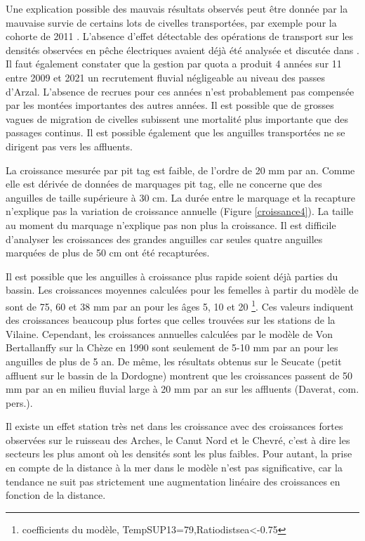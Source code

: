 \documentclass[10pt,twocolumn,titlepage,twoside]{article}\usepackage[]{graphicx}\usepackage[]{color}
\begin{document}
Une explication possible des mauvais résultats observés peut être donnée par la
mauvaise survie de certains lots de civelles transportées, par exemple pour la
cohorte de 2011 \citep{mazel_v._operation_2011}. L'absence d'effet détectable des opérations
de transport sur les densités
observées en pêche électriques avaient déjà été analysée et discutée dans
\citet{briand_analyse_2011}. Il faut également constater que la gestion par
quota a produit 4 années sur 11 entre 2009 et 2021 un
recrutement fluvial négligeable au niveau des passes d'Arzal. L'absence de
recrues pour ces années n'est probablement pas compensée par les montées importantes des autres années. 
Il est possible que de grosses vagues de migration de civelles subissent
une mortalité plus importante que des passages continus. Il est possible
également que les anguilles transportées ne se dirigent pas vers les affluents.


La croissance mesurée par pit tag est faible, de l'ordre de 20 mm par an. Comme
elle est dérivée de données de marquages pit tag, elle ne concerne que des
anguilles de taille supérieure à 30 cm.
La durée entre le marquage et la recapture n'explique pas la variation de
croissance annuelle (Figure \ref{croissance4}). La taille au moment du marquage
n'explique pas non plus la croissance. Il est difficile d'analyser les
croissances des grandes anguilles car seules quatre anguilles marquées de plus
de 50 cm ont été recapturées. 

Il est possible que les anguilles à croissance plus
rapide soient déjà parties du bassin. Les croissances moyennes calculées pour les femelles
à partir du modèle de \citet{daverat_one_2011} sont de 75, 60 et 38 mm par an pour les âges 5, 10 et 20 
\footnote{coefficients du modèle, TempSUP13=79,Ratiodistsea<-0.75}. 
Ces valeurs indiquent des croissances beaucoup plus fortes que celles trouvées sur les stations de 
la Vilaine. Cependant, les croissances annuelles calculées par le modèle de Von Bertallanffy sur
la Chèze en 1990 \citep{mounaix_intercalibration_1992} sont
seulement de 5-10 mm par an pour les anguilles de plus de 5 an. De même, les
résultats obtenus sur le Seucate (petit affluent sur le
bassin de la Dordogne) montrent que les croissances passent de 50 mm par an en
milieu fluvial large à 20 mm par an sur les
affluents (Daverat, com. pers.). 

Il existe un effet station très net dans les croissance avec des croissances
fortes observées sur le ruisseau des Arches, le Canut Nord et le Chevré, c'est à
dire les secteurs les plus amont où les densités sont les plus faibles. Pour
autant, la prise en compte de la distance à la mer dans le modèle n'est pas
significative, car la tendance ne suit pas strictement une augmentation linéaire
des croissances en fonction de la distance.
\end{document}
